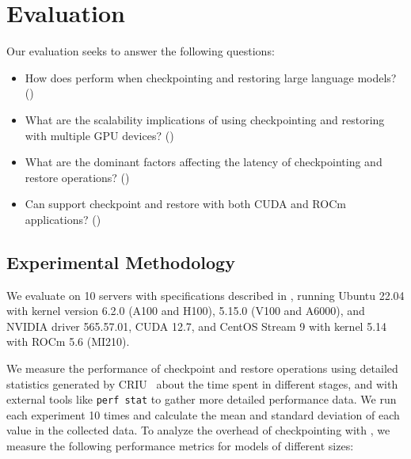 



\section{Evaluation} \label{sec:evaluation}%
%
Our evaluation seeks to answer the following questions:
\begin{itemize}[leftmargin=*,leftmargin=15pt,itemindent=0pt]
    \item How does \sys perform when checkpointing and restoring large language models? (\textsection{\ref{sec:eval:diff-models}})

    \item What are the scalability implications of using checkpointing and restoring with multiple GPU devices? (\textsection{\ref{sec:eval:scalability}})

    \item What are the dominant factors affecting the latency of checkpointing and restore operations? (\textsection{\ref{sec:eval:overhead}})

    \item Can \sys support checkpoint and restore with both CUDA and ROCm applications? (\textsection{\ref{sec:eval:rocm}})
\end{itemize}

\subsection{Experimental Methodology}%
%
We evaluate \sys on 10 servers with specifications described in , running Ubuntu 22.04 with kernel version 6.2.0 (A100 and H100), 5.15.0 (V100 and A6000), and NVIDIA driver 565.57.01, CUDA 12.7, and CentOS Stream 9 with kernel 5.14 with ROCm 5.6 (MI210).

 We measure the performance of checkpoint and restore operations using detailed statistics generated by CRIU~\cite{criu-statistics} about the time spent in different stages, and with external tools like \texttt{perf stat} to gather more detailed performance data. We run each experiment 10 times and calculate the mean and standard deviation of each value in the collected data. To analyze the overhead of checkpointing with \sys, we measure the following performance metrics for models of different sizes:

